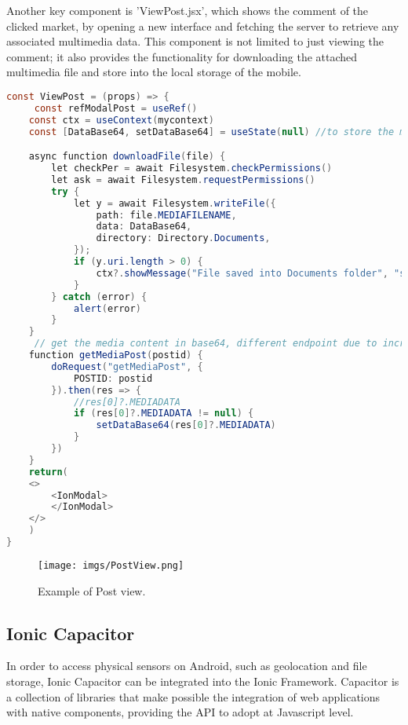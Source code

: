 \documentclass[conference]{IEEEtran}
\begin{document}
Another key component is 'ViewPost.jsx', which shows the comment of the clicked market, by opening a new interface and fetching the server to retrieve any associated multimedia data.
This component is not limited to just viewing the comment; it also provides the functionality for downloading the attached multimedia file and store into the local storage of the mobile.



\begin{lstlisting}[language=Java, caption=ViewPost]
const ViewPost = (props) => {
     const refModalPost = useRef()
    const ctx = useContext(mycontext)
    const [DataBase64, setDataBase64] = useState(null) //to store the mediafile attached

    async function downloadFile(file) {
        let checkPer = await Filesystem.checkPermissions()
        let ask = await Filesystem.requestPermissions()
        try {
            let y = await Filesystem.writeFile({
                path: file.MEDIAFILENAME,
                data: DataBase64,
                directory: Directory.Documents,
            });
            if (y.uri.length > 0) {
                ctx?.showMessage("File saved into Documents folder", "success")
            }
        } catch (error) {
            alert(error)
        }
    }
     // get the media content in base64, different endpoint due to increment performance
    function getMediaPost(postid) {
        doRequest("getMediaPost", {
            POSTID: postid
        }).then(res => {
            //res[0]?.MEDIADATA
            if (res[0]?.MEDIADATA != null) {
                setDataBase64(res[0]?.MEDIADATA)
            }
        })
    }
    return(
    <>
        <IonModal>
        </IonModal>
    </>
    )
}
\end{lstlisting}


\begin{figure}[htbp]
\begin{center}
{\texttt{[image: imgs/PostView.png]}}
\end{center}
\caption{Example of Post view.}
\label{fig}
\end{figure}


\subsection{Ionic Capacitor}

In order to access physical sensors on Android, such as geolocation and file storage, Ionic Capacitor\cite{b10} can be integrated into the Ionic Framework. Capacitor is a collection of libraries that make possible the integration of web applications with native components, providing the API to adopt at Javascript level.
\end{document}
